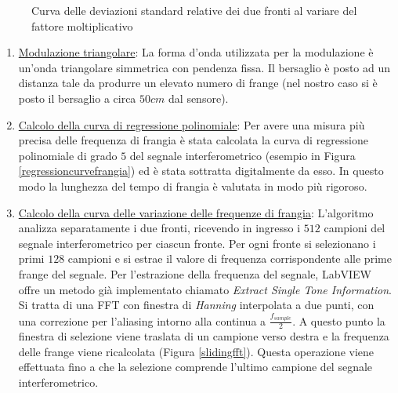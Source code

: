 \begin{figure}
\centering
{}
\hspace{5mm}
\caption{Curva delle deviazioni standard relative dei due fronti al variare del fattore moltiplicativo}\label{mulfact}
\end{figure}

\begin{enumerate}
	\item \underline{Modulazione triangolare}: La forma d'onda utilizzata per la modulazione è un'onda triangolare simmetrica con pendenza fissa. Il bersaglio è posto ad un distanza tale da produrre un elevato numero di frange (nel nostro caso si è posto il bersaglio a circa $50cm$ dal sensore).
	\item \underline{Calcolo della curva di regressione polinomiale}: Per avere una misura più precisa delle frequenza di frangia è stata calcolata la curva di regressione polinomiale di grado $5$ del segnale interferometrico (esempio in Figura \ref{regressioncurvefrangia}) ed è stata sottratta digitalmente da esso. In questo modo la lunghezza del tempo di frangia è valutata in modo più rigoroso.
	\item \underline{Calcolo della curva delle variazione delle frequenze di frangia}: L'algoritmo analizza separatamente i due fronti, ricevendo in ingresso i $512$ campioni del segnale interferometrico per ciascun fronte. Per ogni fronte si selezionano i primi $128$ campioni e si estrae il valore di frequenza corrispondente alle prime frange del segnale. Per l'estrazione della frequenza del segnale, LabVIEW offre un metodo già implementato chiamato \textit{Extract Single Tone Information}. Si tratta di una FFT con finestra di \textit{Hanning} interpolata a due punti, con una correzione per l'aliasing intorno alla continua a $\frac{f_{sample}}{2}$. A questo punto la finestra di selezione viene traslata di un campione verso destra e la frequenza delle frange viene ricalcolata (Figura \ref{slidingfft}). Questa operazione viene effettuata fino a che la selezione comprende l'ultimo campione del segnale interferometrico.
	

\end{enumerate}
